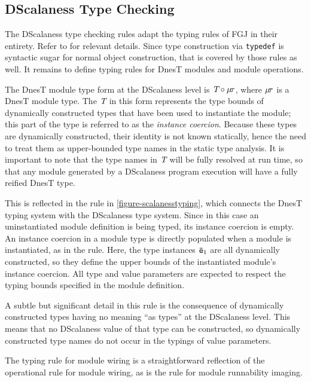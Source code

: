 \subsection{DScalaness Type Checking}
\label{section-scalaness-typing}

\scalanesstypingfig

The DScalaness type checking rules adapt the typing rules of FGJ in their entirety. Refer to
\cite{FJ} for relevant details. Since type construction via \texttt{typedef} is syntactic sugar
for normal object construction, that is covered by those rules as well. It remains to define
typing rules for DnesT modules and module operations.

The DnesT module type form at the DScalaness level is $\textit{T} \circ \mu\!\tau$, where
$\mu\!\tau$ is a DnesT module type. The $\textit{T}$ in this form represents the type bounds of
dynamically constructed types that have been used to instantiate the module; this part of the
type is referred to as the \emph{instance coercion}. Because these types are dynamically
constructed, their identity is not known statically, hence the need to treat them as
upper-bounded type names in the static type analysis. It is important to note that the type
names in $\textit{T}$ will be fully resolved at run time, so that any module generated by a
DScalaness program execution will have a fully reified DnesT type.

This is reflected in the  rule in \autoref{figure-scalanesstyping}, which connects
the DnesT typing system with the DScalaness type system. Since in this case an uninstantiated
module definition is being typed, its instance coercion is empty. An instance coercion in a
module type is directly populated when a module is instantiated, as in the 
rule. Here, the type instances ${\mathtt{\bar{e}}}_1$ are all dynamically constructed, so they define the
upper bounds of the instantiated module's instance coercion. All type and value parameters are
expected to respect the typing bounds specified in the module definition.

A subtle but significant detail in this rule is the consequence of dynamically constructed types
having no meaning ``as types'' at the DScalaness level. This means that no DScalaness value of
that type can be constructed, so dynamically constructed type names do not occur in the typings
of value parameters.

The  typing rule for module wiring is a straightforward reflection of the
operational rule for module wiring, as is the  rule for module runnability
imaging.

